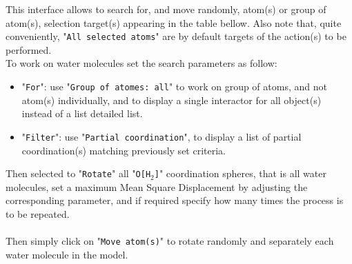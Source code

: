 This interface allows to search for, and move randomly, atom(s) or group of atom(s), selection target(s) appearing in the table bellow. 
Also note that, quite conveniently, "\texttt{All~selected~atoms}" are by default targets of the action(s) to be performed. \\
To work on water molecules set the search parameters as follow:
\begin{itemize}
\item "\texttt{For}": use "\texttt{Group~of~atomes:~all}" to work on group of atoms, and not atom(s) individually, and to display a single interactor for all object(s) instead of a list detailed list. 
\item "\texttt{Filter}": use "\texttt{Partial~coordination}", to display a list of partial coordination(s) matching previously set criteria. 
\end{itemize}
Then selected to "\texttt{Rotate}" all "\texttt{O[H$_2$]}" coordination spheres, that is all water molecules, set a maximum Mean Square Displacement by adjusting the corresponding parameter, and if required specify how many times the process is to be repeated. \\[0.5cm]
\\
Then simply click on "\texttt{Move atom(s)}" to rotate randomly and separately each water molecule in the model.


